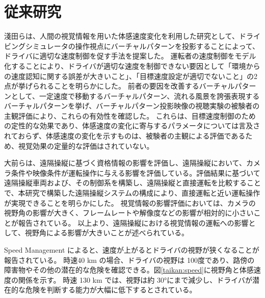 \section{従来研究}
淺田ら\cite{taikan:asada}は、人間の視覚情報を用いた体感速度変化を利用した研究として、ドライビングシミュレータの操作視点にバーチャルパターンを投影することによって、ドライバに適切な速度制御を促す手法を提案した。
運転者の速度制御をモデル化することにより、ドライバが適切な速度を制御できない要因として「環境からの速度認知に関する誤差が大きいこと」、「目標速度設定が適切でないこと」の2点が挙げられることを明らかにした。
前者の要因を改善するバーチャルパターンとして、一定速度で移動するバーチャルパターン、流れる風景を誇張表現するバーチャルパターンを挙げ、バーチャルパターン投影映像の視聴実験の被験者の主観評価により、これらの有効性を確認した。
これらは、目標速度制御のための定性的な効果であり、体感速度の変化に寄与するパラメータについては言及されておらず、体感速度の変化を示すものは、被験者の主観による評価であるため、視覚効果の定量的な評価はされていない。

大前ら\cite{taikan:ohmae}は、遠隔操縦に基づく資格情報の影響を評価し、遠隔操縦において、カメラ条件や映像条件が運転操作に与える影響を評価している。評価結果に基づいて遠隔操縦車両および、その制御系を構築し、遠隔操縦と直接運転を比較することで、本研究で構築した遠隔操縦システムの構成により、直接運転と近い運転操作が実現できることを明らかにした。
視覚情報の影響評価においては、カメラの視野角の影響が大きく、フレームレートや解像度などの影響が相対的に小さいことが報告されている。
以上より、遠隔操縦における視覚情報の運転への影響として、視野角による影響が大きいことが述べられている。

Speed Management \cite{taikan:speedmanagement}によると、速度が上がるとドライバの視野が狭くなることが報告されている。
時速40 km の場合、ドライバの視野は 100度であり、路傍の障害物やその他の潜在的な危険を確認できる。図\ref{taikan:speed}に視野角と体感速度の関係を示す。
時速 130 km では、視野は約 30°にまで減少し、ドライバが潜在的な危険を判断する能力が大幅に低下するとされている。

